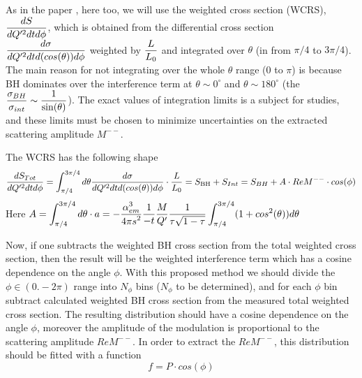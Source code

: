 \documentclass[letterpaper,12pt]{article}
\def\dfrac#1#2{\displaystyle{{#1}\over{#2}}}
\def \dstl {\displaystyle}
\begin{document}
As in the paper \cite{Berger:2001xd}, here too, we will use the weighted cross section (WCRS),
$\dfrac{dS}{dQ^{\prime 2} dt d\phi}$, which is obtained from the differential cross section $\dfrac{d\sigma}{dQ^{\prime 2}dt d(cos(\theta))d\phi}$ weighted by $\dfrac{L}{L_{0}}$ and integrated over $\theta$ (in \cite{Berger:2001xd} from $\pi/4$ to $3\pi/4$). The main reason for not integrating over the whole $\theta$ range ($0$ to $\pi$) is because BH dominates over the interference term at $\theta \sim 0^{\circ}$ and $\theta \sim 180^{\circ}$ (the $\dfrac{\sigma_{BH}}{\sigma_{int}}\sim \dfrac{1}{\sin(\theta)}$). The exact values of integration limits is a subject for studies, and these limits must be chosen to minimize uncertainties on the extracted scattering amplitude $M^{--}$.
 
 The WCRS has the following shape
 \begin{equation}
  \dfrac{dS_{Tot}}{dQ^{\prime 2} dt d\phi} = \int_{\pi/4}^{3\pi/4}d\theta \dfrac{d\sigma}{dQ^{\prime 2}dt d(cos(\theta))d\phi}\cdot\frac{L}{L_{0}} = S_{\mathrm{BH}} + S_{Int} = S_{BH} + A\cdot Re M^{--}\cdot cos(\phi)
  \label{eq:weighted_crs}
 \end{equation}
 Here $A = \dstl \int_{\pi/4}^{3\pi/4}d\theta\cdot a = - \frac{\dstl \alpha_{em}^{3}}{\dstl 4\pi s^{2}} \dfrac{1}{-t}\dfrac{M}{Q^{\prime}}
\dfrac{1}{\tau\sqrt{1-\tau}} \int_{\pi/4}^{3\pi/4}(1 + cos^{2}(\theta))d\theta$

 Now, if one subtracts the weighted BH cross section from the total weighted cross section, then the result will be the weighted interference term which has a cosine dependence on the angle $\phi$.
 With this proposed method we should divide the $\phi\in(0. - 2\pi)$ range into $N_{\phi}$ bins ($N_{\phi}$ to be determined), and for each $\phi$ bin subtract calculated weighted BH cross section from the measured total weighted cross section. The resulting distribution should have a cosine dependence on the angle $\phi$, moreover the amplitude of the modulation is proportional to the scattering amplitude $ReM^{--}$. In order to extract the $ReM^{--}$, this distribution should be fitted with a function
 \begin{equation}
    f = P\cdot cos(\phi)
 \end{equation}
\end{document}
